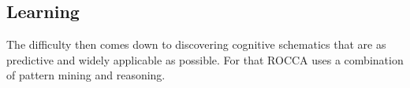 \documentclass[runningheads]{llncs}
\newcommand{\lpreimp}[1]{\leadsto^{#1}}
\begin{document}

\subsection{Learning}
The difficulty then comes down to discovering cognitive schematics
that are as predictive and widely applicable as possible.  For that
ROCCA uses a combination of pattern mining and reasoning.
\end{document}
